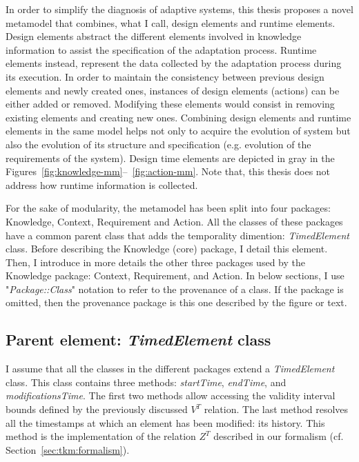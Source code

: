  In order to simplify the diagnosis of adaptive systems, this thesis proposes a novel \gls{metamodel} that combines, what I call, design elements and runtime elements.
Design elements abstract the different elements involved in \gls{knowledge} information to assist the specification of the adaptation process.
Runtime elements instead, represent the data collected by the adaptation process during its execution.
In order to maintain the consistency between previous design elements and newly created ones, instances of design elements (\eg actions) can be either added or removed.
Modifying these elements would consist in removing existing elements and creating new ones.
Combining design elements and runtime elements in the same model helps not only to acquire the evolution of system but also the evolution of its structure and specification (e.g. evolution of the requirements of the system).
Design time elements are depicted in gray in the Figures~\ref{fig:knowledge-mm}--~\ref{fig:action-mm}.
Note that, this thesis does not address how runtime information is collected.

For the sake of modularity, the \gls{metamodel} has been split into four packages: Knowledge, Context, Requirement and Action.
All the classes of these packages have a common parent class that adds the temporality dimention: \textit{TimedElement} class.
Before describing the Knowledge (core) package, I detail this element.
Then, I introduce in more details the other three packages used by the Knowledge package: Context, Requirement, and Action. 
In below sections, I use "\textit{Package::Class}" notation to refer to the provenance of a class.
If the package is omitted, then the provenance package is this one described by the figure or text.

\subsection{Parent element: \textit{TimedElement} class}
I assume that all the classes in the different packages extend a \textit{TimedElement} class. 
This class contains three methods: \textit{startTime}, \textit{endTime}, and \textit{modificationsTime}.
The first two methods allow accessing the validity interval bounds defined by the previously discussed $V^T$ relation.
The last method resolves all the timestamps at which an element has been modified: its history. 
This method is the implementation of the relation $Z^T$ described in our formalism (cf. Section~\ref{sec:tkm:formalism}).



